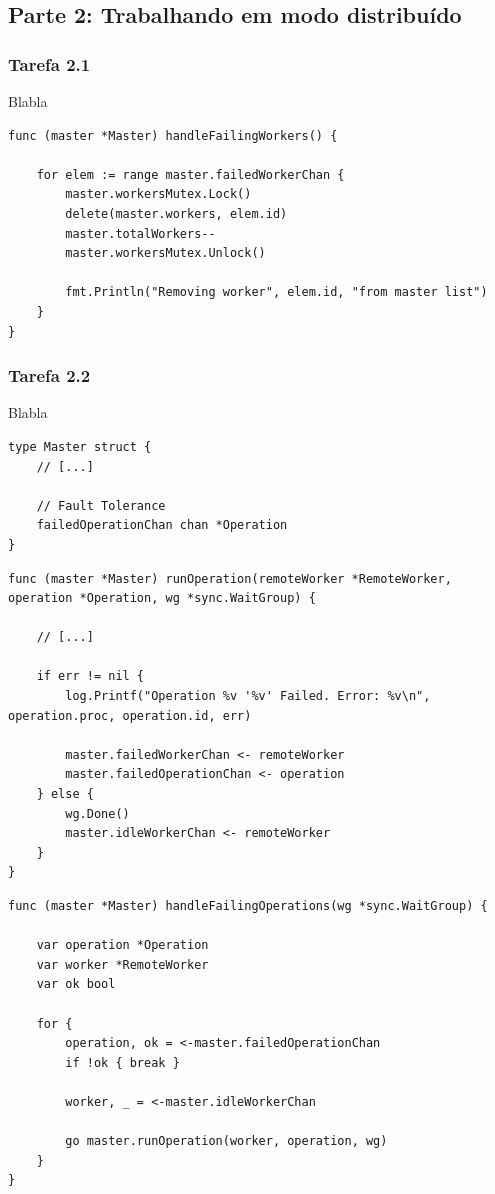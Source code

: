 \documentclass[conference]{IEEEtran}
\begin{document}
\subsection{Parte 2: Trabalhando em modo distribuído}

\subsubsection{Tarefa 2.1} Blabla

\begin{lstlisting}
func (master *Master) handleFailingWorkers() {

	for elem := range master.failedWorkerChan {
		master.workersMutex.Lock()
		delete(master.workers, elem.id)
		master.totalWorkers--
		master.workersMutex.Unlock()

		fmt.Println("Removing worker", elem.id, "from master list")
	}
}
\end{lstlisting}

\subsubsection{Tarefa 2.2} Blabla

\begin{lstlisting}
type Master struct {
	// [...]

	// Fault Tolerance
	failedOperationChan chan *Operation
}
\end{lstlisting}

\begin{lstlisting}
func (master *Master) runOperation(remoteWorker *RemoteWorker, operation *Operation, wg *sync.WaitGroup) {

	// [...]

	if err != nil {
		log.Printf("Operation %v '%v' Failed. Error: %v\n", operation.proc, operation.id, err)
		
		master.failedWorkerChan <- remoteWorker
		master.failedOperationChan <- operation
	} else {
		wg.Done()
		master.idleWorkerChan <- remoteWorker
	}
}
\end{lstlisting}

\begin{lstlisting}
func (master *Master) handleFailingOperations(wg *sync.WaitGroup) {

	var operation *Operation
	var worker *RemoteWorker
	var ok bool

	for {
		operation, ok = <-master.failedOperationChan
		if !ok { break }

		worker, _ = <-master.idleWorkerChan

		go master.runOperation(worker, operation, wg)
	}
}
\end{lstlisting}
\end{document}
